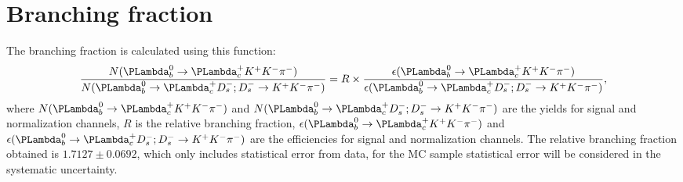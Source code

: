 
\section{Branching fraction}
\label{sec:branching_fraction}

The branching fraction is calculated using this function:
\begin{equation}
	\frac{N(\Lb\to\Lc\Kp\Km \pi^-)}{N(\LbLcDskkpi)} = R \times \frac{\epsilon(\Lb \to \Lc \Kp \Km \pi^-)}{\epsilon(\LbLcDskkpi)},
\end{equation}
where $N(\LbLckkpi)$ and $N(\LbLcDskkpi)$ are the yields for signal and normalization channels, 
$R$ is the relative branching fraction, 
$\epsilon(\LbLckkpi)$ and $\epsilon(\LbLcDskkpi)$ are the efficiencies for signal and normalization channels.
The relative branching fraction obtained is $1.7127 \pm 0.0692$,
which only includes statistical error from data, 
for the MC sample statistical error will be considered in the systematic uncertainty.




